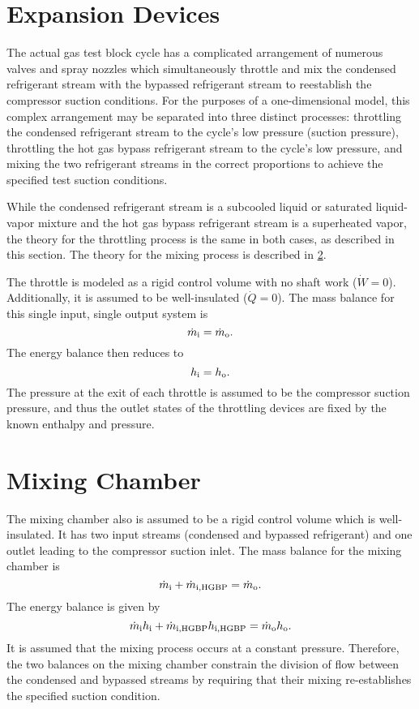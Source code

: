 \section{Expansion Devices} \label{sec:Expand}
The actual gas test block cycle has a complicated arrangement 
of numerous valves and spray nozzles which simultaneously throttle and mix 
the condensed refrigerant stream with the bypassed refrigerant stream 
to reestablish the compressor suction conditions.
For the purposes of a one-dimensional model, this complex arrangement
may be separated into three distinct processes: 
throttling the condensed refrigerant stream to the cycle's low pressure (suction pressure),
throttling the hot gas bypass refrigerant stream to the cycle's low pressure, and
mixing the two refrigerant streams in the correct proportions 
to achieve the specified test suction conditions.

While the condensed refrigerant stream is a subcooled liquid 
or saturated liquid-vapor mixture and the hot gas bypass refrigerant stream
is a superheated vapor, the theory for the throttling process is the same
in both cases, as described in this section.
The theory for the mixing process is described in \cref{sec:Mixing}.

The throttle is modeled as a rigid control volume with no shaft work ($\dot{W}=0$).
Additionally, it is assumed to be well-insulated ($\dot{Q}=0$). The mass balance for this single input,
single output system is
\begin{equation}
  \dot{m}_{\text{i}} = \dot{m}_{\text{o}}.
\end{equation}
The energy balance then reduces to
\begin{equation}
  h_{\text{i}} = h_{\text{o}}.
\end{equation}
The pressure at the exit of each throttle is assumed to be the 
compressor suction pressure, and thus the outlet states of the
throttling devices are fixed by the known enthalpy and pressure.

\section{Mixing Chamber} \label{sec:Mixing}
The mixing chamber also is assumed to be a rigid control volume which is well-insulated.
It has two input streams (condensed and bypassed refrigerant) and one outlet leading to the
compressor suction inlet.
The mass balance for the mixing chamber is
\begin{equation}
  \dot{m}_{\text{i}} + \dot{m}_{\text{i},\text{HGBP}} = \dot{m}_{\text{o}}.
\end{equation}
The energy balance is given by
\begin{equation}
  \dot{m}_{\text{i}}h_{\text{i}} + \dot{m}_{\text{i},\text{HGBP}}h_{\text{i},\text{HGBP}} = \dot{m}_{\text{o}}h_{\text{o}}.
\end{equation}
It is assumed that the mixing process occurs at a constant pressure.
Therefore, the two balances on the mixing chamber constrain the division of flow between
the condensed and bypassed streams by requiring that their mixing re-establishes
the specified suction condition.